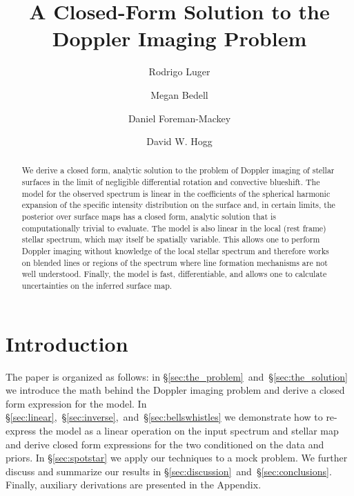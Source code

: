 \documentclass[modern]{aastex631}
\begin{document}
\title{A Closed-Form Solution to the Doppler Imaging Problem}

\author[0000-0002-0296-3826]{Rodrigo Luger}
%
\author{Megan Bedell}
%
\author{Daniel Foreman-Mackey}
%
\author{David W. 
Hogg}

\begin{abstract}
    We derive a closed form, analytic solution to the problem of Doppler imaging of stellar surfaces in the limit of negligible differential rotation and convective blueshift.
    The model for the observed spectrum is linear in the coefficients of the spherical harmonic expansion of the specific intensity distribution on the surface and, in certain limits, the posterior over surface maps has a closed form, analytic solution that is computationally trivial to evaluate.
    The model is also linear in the local (rest frame) stellar spectrum, which may itself be spatially variable.
    This allows one to perform Doppler imaging without knowledge of the local stellar spectrum and therefore works on blended lines or regions of the spectrum where line formation mechanisms are not well understood.
    Finally, the model is fast, differentiable, and allows one to calculate uncertainties on the inferred surface map.
\end{abstract}

\section{Introduction}
The paper is organized as follows: in \S\ref{sec:the_problem}~and~\S\ref{sec:the_solution} we introduce the math behind the Doppler imaging problem and derive a closed form expression for the model. 
In \S\ref{sec:linear},~\S\ref{sec:inverse},~and~\S\ref{sec:bellswhistles} we demonstrate how to re-express the model as a linear operation on the input spectrum and stellar map and derive closed form expressions for the two conditioned on the data and priors.
In \S\ref{sec:spotstar} we apply our techniques to a mock problem. 
We further discuss and summarize our results in \S\ref{sec:discussion}~and~\S\ref{sec:conclusions}. 
Finally, auxiliary derivations are presented in the Appendix.
\end{document}
